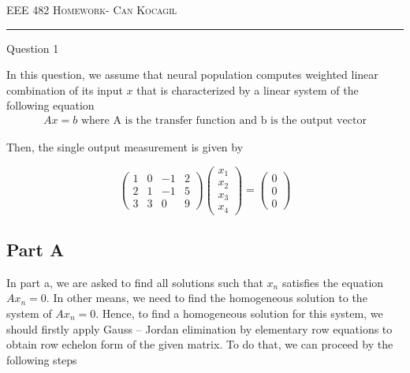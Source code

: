 \documentclass[12pt]{amsart}
\makeatletter
\def\section{\@startsection{section}{1}%
  \z@{.7\linespacing\@plus\linespacing}{.5\linespacing}%
  {\normalfont\scshape}}%
\makeatother
\begin{document}
\newpage


{\scshape EEE 482} \hfill {\scshape \large  Homework-\relax} \hfill {\scshape Can Kocagil}
\smallskip
\hrule



\section{Question 1}

In this question, we assume that neural population computes weighted linear combination of its input $x$ that is characterized by a linear system of the following equation
\begin{align*}
 Ax = b \text{ where A is the transfer function and b is the output vector} 
\end{align*}

Then, the single output measurement is given by

\[
\begin{pmatrix}
 1 & 0& -1& 2\\ 
 2&  1& -1& 5\\ 
 3&  3& 0& 9
\end{pmatrix}
\begin{pmatrix}
 x_{1}  \\ 
 x_{2}  \\ 
 x_{3}  \\
 x_{4}
\end{pmatrix} =
\begin{pmatrix}
0 \\
0 \\
0 
\end{pmatrix}
\]

\subsection{Part A}

In part a, we are asked to find all solutions such that $x_n$ satisfies the equation $Ax_n = 0$. In other means, we need to find the homogeneous solution to the system of $Ax_n = 0$. Hence, to find a homogeneous solution for this system, we should firstly apply Gauss – Jordan elimination by elementary row equations to obtain row echelon form of the given matrix. To do that, we can proceed by the following steps 
\end{document}
